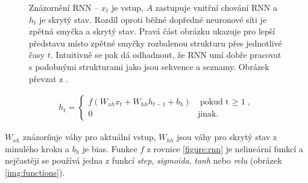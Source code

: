 \begin{figure}[h]
    \begin{center}
    \end{center}
	\caption{Znázornění RNN -- $x_t$ je vstup, $A$ zastupuje vnitřní chování RNN a $h_t$ je skrytý stav. Rozdíl oproti běžné dopředné neuronové síti je zpětná smyčka a skrytý stav. Pravá část obrázku ukazuje pro lepší představu místo zpětné smyčky rozbalenou strukturu přes jednotlivé časy $t$. Intuitivně se pak dá odhadnout, že RNN umí dobře pracovat s podobnými strukturami jako jsou sekvence a seznamy. Obrázek převzat z \cite{understandingLSTM}.}	
	\label{img:rnn}
\end{figure}

\begin{align}\label{figure:rnn}
  h_t = \begin{cases}
          f(W_{xh}x_t + W_{hh}h_{t-1} + b_h) & \mbox{pokud t $\geq$ 1}, \\
          0 & \mbox{jinak}.
        \end{cases}
\end{align}


$W_{xh}$ znázorňuje váhy pro aktuální vstup, $W_{hh}$ jsou váhy pro skrytý stav z minulého kroku a $b_h$ je bias. Funkce $f$ z rovnice \ref{figure:rnn} je nelineární funkcí a nejčastěji se používá jedna z funkcí \emph{step}, \emph{sigmoida}, \emph{tanh} nebo \emph{relu} (obrázek \ref{img:functions}).

